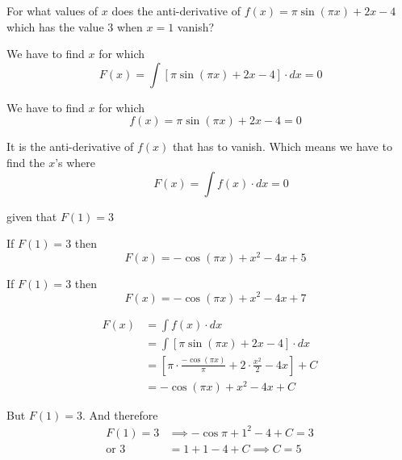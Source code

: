 \documentclass[14pt,fleqn]{extarticle}
\newcommand\fx{\pi\sin \left(\pi x \right) + 2x - 4}
\begin{document}
 
\begin{problem}
	\statement 
    
    For what values of $x$ does the anti-derivative of $f(x) = \fx$ which has the value $3$ when $x = 1$ vanish? 
    
    \begin{step}
  \begin{options} 
     \correct 
       
       We have to find $x$ for which 
       \[ \, F(x) = \int \left[\fx \right]\cdot dx = 0  \]
     \incorrect
     
     We have to find $x$ for which 
       \[ \quad f(x) = \fx = 0 \]
        
    \end{options} 
     \reason 
     
     It is the anti-derivative of $f(x)$ that has to vanish. Which means we have to find the $x$'s where 
     \[ \qquad F(x) = \int f(x)\cdot dx = 0 \]
     
     given that $F(1) = 3$ 
       
\end{step} 

\begin{step}
  \begin{options} 
     \correct 
       
       If $F(1) = 3$ then 
       \[\quad F(x) = -\cos \left(\pi x \right) + x^2 - 4x + 5 \]
       
     \incorrect
        
        If $F(1) = 3$ then 
       \[\quad F(x) = -\cos \left(\pi x \right) + x^2 - 4x + 7 \]
    \end{options} 
     \reason 
       
       \begin{align}
	F(x) &= \int f(x)\cdot dx \\
	&= \int \left[\fx \right]\cdot dx \\
	&= \left[\pi\cdot\frac{-\cos \left(\pi x \right)}{\pi} + 2\cdot\frac{x^2}{2} - 4x\right] + C \\
	&= -\cos \left(\pi x \right)+ x^2 - 4x + C
\end{align}

But $F(1) = 3$. And therefore 
\begin{align}
F(1) = 3 &\implies -\cos \pi + 1^2 - 4 + C = 3 	\\
\text{or } 3 &= 1 + 1 -4 + C \implies C = 5 
\end{align}
\end{step}


\end{problem}
\end{document}
